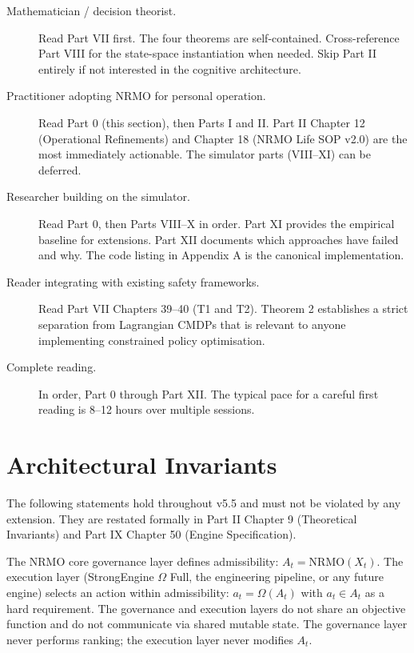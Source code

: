\begin{description}
\item[Mathematician / decision theorist.] Read Part VII first. The
four theorems are self-contained. Cross-reference Part VIII for the
state-space instantiation when needed. Skip Part II entirely if not
interested in the cognitive architecture.

\item[Practitioner adopting NRMO for personal operation.] Read Part 0
(this section), then Parts I and II. Part II Chapter 12 (Operational
Refinements) and Chapter 18 (NRMO Life SOP v2.0) are the most
immediately actionable. The simulator parts (VIII--XI) can be deferred.

\item[Researcher building on the simulator.] Read Part 0, then Parts
VIII--X in order. Part XI provides the empirical baseline for
extensions. Part XII documents which approaches have failed and why.
The code listing in Appendix A is the canonical implementation.

\item[Reader integrating with existing safety frameworks.] Read Part
VII Chapters 39--40 (T1 and T2). Theorem 2 establishes a strict
separation from Lagrangian CMDPs that is relevant to anyone
implementing constrained policy optimisation.

\item[Complete reading.] In order, Part 0 through Part XII. The
typical pace for a careful first reading is 8--12 hours over multiple
sessions.
\end{description}

\section*{Architectural Invariants}

The following statements hold throughout v5.5 and must not be violated
by any extension. They are restated formally in Part II Chapter 9
(Theoretical Invariants) and Part IX Chapter 50 (Engine Specification).

\begin{invariant}
\label{inv:gov-exec-sep}
The NRMO core governance layer defines admissibility:
$A_t = \mathrm{NRMO}(X_t)$. The execution layer (StrongEngine $\Omega$
Full, the engineering pipeline, or any future engine) selects an action
within admissibility: $a_t = \Omega(A_t)$ with $a_t \in A_t$ as a
hard requirement. The governance and execution layers do not share an
objective function and do not communicate via shared mutable state. The
governance layer never performs ranking; the execution layer never
modifies $A_t$.
\end{invariant}

